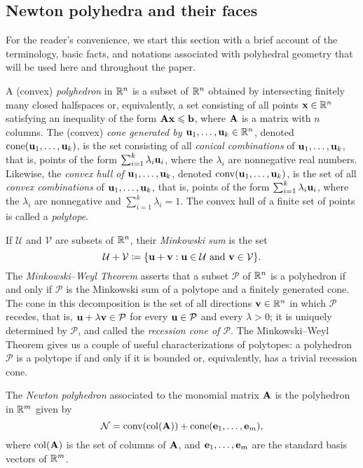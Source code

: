 \documentclass{amsart}
\begin{document}
\subsection{Newton polyhedra and their faces}

For the reader's convenience, we start this section with a brief account of the terminology, basic facts, and notations associated with polyhedral geometry that will be used here and throughout the paper.

A (convex) \emph{polyhedron} in $\mathbb{R}^n$ is a subset of $\mathbb{R}^n$ obtained by intersecting finitely many closed halfspaces or, equivalently, a set consisting of all points $\mathbf{x}\in \mathbb{R}^n$ satisfying an inequality of the form $\mathbf{A}\mathbf{x}\leqslant \mathbf{b}$, where $\mathbf{A}$ is a matrix with $n$ columns.
The (convex) \emph{cone generated by $\mathbf{u}_1,\ldots,\mathbf{u}_k \in \mathbb{R}^n$}, denoted $\operatorname{cone}(\mathbf{u}_1,\ldots,\mathbf{u}_k)$, is the set consisting of all \emph{conical combinations} of $\mathbf{u}_1, \ldots, \mathbf{u}_k$, that is, points of the form $\sum_{i=1}^k \lambda_i \mathbf{u}_i$, where the $\lambda_i$ are nonnegative real numbers.
Likewise, the \emph{convex hull of $\mathbf{u}_1,\ldots,\mathbf{u}_k$}, denoted $\operatorname{conv}(\mathbf{u}_1,\ldots,\mathbf{u}_k)$, is the set of all \emph{convex combinations} of $\mathbf{u}_1, \ldots, \mathbf{u}_k$, that is, points of the form $\sum_{i=1}^k \lambda_i \mathbf{u}_i$, where the $\lambda_i$ are nonnegative and $\sum_{i=1}^k \lambda_i = 1$.
The convex hull of a finite set of points is called a \emph{polytope}.

If $\mathcal{U}$ and $\mathcal{V}$ are subsets of $\mathbb{R}^n$, their \emph{Minkowski sum} is the set
\[\mathcal{U}+\mathcal{V} \coloneqq \{\mathbf{u}+\mathbf{v}: \mathbf{u}\in \mathcal{U}\text{ and }\mathbf{v}\in \mathcal{V}\}.\]
The \emph{Minkowski--Weyl Theorem} asserts that a subset $\mathcal{P}$ of $\mathbb{R}^n$ is a polyhedron if and only if $\mathcal{P}$ is the Minkowski sum of a polytope and a finitely generated cone.
The cone in this decomposition is the set of all directions $\mathbf{v} \in \mathbb{R}^n$ in which $\mathcal{P}$ recedes, that is, $\mathbf{u} + \lambda \mathbf{v} \in \mathcal{P}$ for every $\mathbf{u} \in \mathcal{P}$ and every $\lambda > 0$; it is uniquely determined by $\mathcal{P}$, and called the \emph{recession cone of $\mathcal{P}$}.
The Minkowski--Weyl Theorem gives us a couple of useful characterizations of polytopes: a polyhedron $\mathcal{P}$ is a polytope if and only if it is bounded or, equivalently, has a trivial recession cone.

\begin{definition}
The \emph{Newton polyhedron} associated to the monomial matrix $\mathbf{A}$ is the polyhedron in $\mathbb{R}^m$ given by
\[ \mathcal{N} = \operatorname{conv}( \operatorname{col}(\mathbf{A}) ) + \operatorname{cone}( \mathbf{e}_1, \ldots, \mathbf{e}_m), \]
where $\operatorname{col}(\mathbf{A})$ is the set of columns of $\mathbf{A}$, and $\mathbf{e}_1, \ldots, \mathbf{e}_m$ are the standard basis vectors of $\mathbb{R}^m$.
\end{definition}
\end{document}

